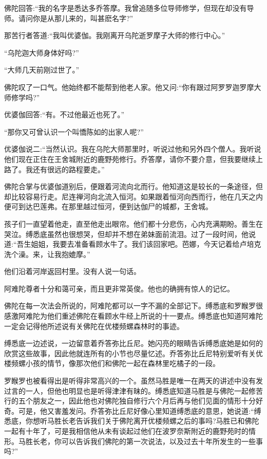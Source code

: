 \documentclass[12pt,twoside,openany]{book}
\begin{document}
佛陀回答:“我的名字是悉达多乔答摩。我曾追随多位导师修学，但现在却没有导师。请问你是从那儿来的，叫甚麽名字?”

那苦行者答道:“我叫优婆伽。我刚离开乌陀逝罗摩子大师的修行中心。”

“乌陀迦大师身体好吗?”

“大师几天前刚过世了。”

佛陀叹了一口气。他始终都不能帮到他老人家。他又问:“你有跟过阿罗罗迦罗摩大师修学吗?”

优婆伽回答:“有。不过他最近也死了。”

“那你又可曾认识一个叫憍陈如的出家人呢?”

优婆伽说二:“当然认识。我在乌陀大师那里时，听说过他和另外四个僧人。我听说他们现在正住在王舍城附近的鹿野苑修行。乔答摩，请你不要介意，但我要继续上路了。我还有很远的路程要走。”

佛陀合掌与优婆伽道别后，便跟着河流向北而行。他知道这是较长的一条途径，但却比较容易行走。尼连禅河向北流入恒河。如果跟着恒河向西而行，他在几天之内便可到达巴莲弗。在那里越过恒河，便到达伽尸的城都，王舍城。

孩子们一直望着他走，直至他走出眼帘。他们都十分悲伤，心内充满期盼。善生在哭泣。缚悉底虽然也很想哭，但却并不想在弟妹面前流泪。过了一段时间，他说道:“吾生姐姐，我要去准备看顾水牛了。我们该回家吧。芭娜，今天记着给卢培克洗个澡。来，让我抱媲摩。”

他们沿着河岸返回村里。没有人说一句话。

阿难陀尊者十分和蔼可亲，而且更非常英俊。他也的确拥有惊人的记忆。

佛陀在每一次法会所说的，阿难陀都可以一字不漏的全部记下。缚悉底和罗睺罗很感激阿难陀为他们重述佛陀在看顾水牛经上所说的十一要点。缚悉底也知道阿难陀一定会记得他所述说有关佛陀在优楼频螺森林时的事迹。

缚悉底一边述说，一边留意着乔答弥比丘尼。她闪亮的眼睛告诉缚悉底她是如何的欣赏这些故事，因此他就连所有的小节也尽量忆述。乔答弥比丘尼特别爱听有关优楼频螺小孩的情节，像那次他们和佛陀一起在森林里吃橘子的一段。

罗睺罗也被看得出是听得非常高兴的一个。虽然马胜是唯一在两天的讲述中没有发过言的一人，但他也明显也是听得津津有昧的。缚悉底知道马胜是与佛陀一起修苦行的五个朋友之一，因此他也对佛陀独自修行六个月后再与他们见面的情形十分好奇。可是，他又害羞发问。乔答弥比丘尼好像心里知道缚悉底的意思，她说道:“缚悉底，你想听马胜长老告诉我们关于佛陀离开优楼频螺之后的事吗?马胜已和佛陀一起有十年了，可是我相信他从未有谈起过他们在波罗奈斯附近的鹿野苑时的情形。马胜长老，你可以告诉我们佛陀的第一次说法，以及过去十年所发生的一些事吗?”
\end{document}
